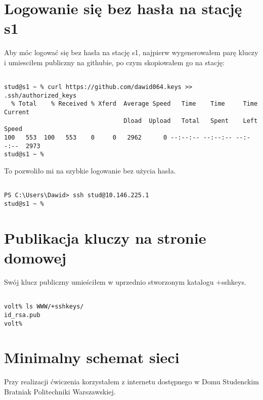 \documentclass[a4paper,11pt]{article}
\begin{document}
\section{Logowanie się bez hasła na stację s1}

Aby móc logować się bez hasła na stację s1, najpierw wygenerowałem parę kluczy i umiesciłem publiczny na githubie, po czym skopiowałem go na stację:

\begin{verbatim}

stud@s1 ~ % curl https://github.com/dawid064.keys >> .ssh/authorized_keys
  % Total    % Received % Xferd  Average Speed   Time    Time     Time  Current
                                 Dload  Upload   Total   Spent    Left  Speed
100   553  100   553    0     0   2962      0 --:--:-- --:--:-- --:--:--  2973
stud@s1 ~ %

\end{verbatim}

To pozwoliło mi na szybkie logowanie bez użycia hasła.
\begin{verbatim}

PS C:\Users\Dawid> ssh stud@10.146.225.1
stud@s1 ~ %

\end{verbatim}

\section{Publikacja kluczy na stronie domowej}

Swój klucz publiczny umieściłem w uprzednio stworzonym katalogu +sshkeys.

\begin{verbatim}

volt% ls WWW/+sshkeys/
id_rsa.pub
volt%

\end{verbatim}

\section{Minimalny schemat sieci}

Przy realizacji ćwiczenia korzystałem z internetu dostępnego w Domu Studenckim Bratniak Politechniki Warszawskiej.

\pagebreak

\end{document}
